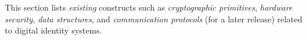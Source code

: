 \section{\sfi}
\label{sub:foundations}

This section lists \emph{existing} constructs such as \emph{cryptographic primitives}, \emph{hardware security}, \emph{data structures}, and \emph{communication protocols} (for a later release) related to digital identity systems.



